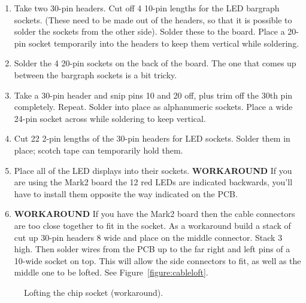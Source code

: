 \documentclass[11pt]{article}
\begin{document}
\begin{enumerate}
\item Take two 30-pin headers.  Cut off 4 10-pin lengths for
      the LED bargraph sockets.  (These need to be made out
      of the headers, so that it is possible to solder the
      sockets from the other side).  Solder these to the board.
      Place a 20-pin socket temporarily into the headers to 
      keep them vertical while soldering.
\item Solder the 4 20-pin sockets on the back of the board.
      The one that comes up between the bargraph sockets is a bit tricky.
\item Take a 30-pin header and snip pins 10 and 20 off, plus trim off
      the 30th pin completely.  Repeat.  Solder into place as
      alphanumeric sockets.  Place a wide 24-pin socket across while
      soldering to keep vertical.
\item Cut 22 2-pin lengths of the 30-pin headers for LED sockets.
      Solder them in place; scotch tape can temporarily hold them.
\item Place all of the LED displays into their sockets.
      {\bf WORKAROUND} If you are using the
      Mark2 board the 12 red LEDs are indicated backwards, you'll
      have to install them opposite the way indicated on the PCB.
\item {\bf WORKAROUND} If you have the Mark2 board then the
      cable connectors are too close together to fit in the socket.
      As a workaround build a stack of cut up 30-pin headers 8 wide
      and place on the middle connector.
      Stack 3 high.  Then solder wires from the PCB up to the far right and 
      left pins of a 10-wide socket on top. This will allow the side 
      connectors to fit, as well as the middle one to be lofted.
      See Figure~\ref{figure:cableloft}.
\end{enumerate}



\begin{figure*}[tbp]
\begin{center}
\caption{Lofting the chip socket (workaround).}
\label{figure:chiploft}
\end{center}
\end{figure*}
\end{document}
